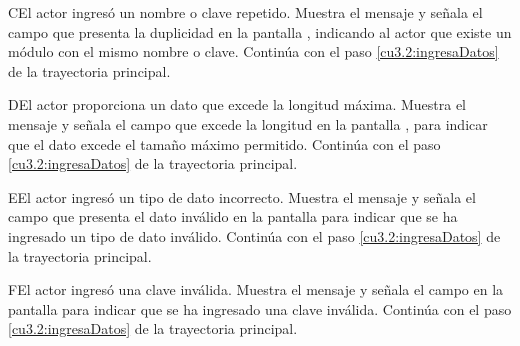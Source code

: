  \begin{UCtrayectoriaA}{C}{El actor ingresó un nombre o clave repetido.}
    \UCpaso[\UCsist] Muestra el mensaje  y señala el campo que presenta la duplicidad en la pantalla 
	    , indicando al actor que existe un módulo con el mismo nombre o clave.
    \UCpaso[] Continúa con el paso \ref{cu3.2:ingresaDatos} de la trayectoria principal.
 \end{UCtrayectoriaA}
 
 \begin{UCtrayectoriaA}{D}{El actor proporciona un dato que excede la longitud máxima.}
    \UCpaso[\UCsist] Muestra el mensaje  y señala el campo que excede la 
    longitud en la pantalla , para indicar que el dato excede el tamaño máximo permitido.
    \UCpaso[] Continúa con el paso \ref{cu3.2:ingresaDatos} de la trayectoria principal.
 \end{UCtrayectoriaA}
 
 \begin{UCtrayectoriaA}{E}{El actor ingresó un tipo de dato incorrecto.}
    \UCpaso[\UCsist] Muestra el mensaje  y señala el campo que presenta el dato inválido en la 
    pantalla  para indicar que se ha ingresado un tipo de dato inválido.
    \UCpaso[] Continúa con el paso \ref{cu3.2:ingresaDatos} de la trayectoria principal.
 \end{UCtrayectoriaA}
 \begin{UCtrayectoriaA}{F}{El actor ingresó una clave inválida.}
    \UCpaso[\UCsist] Muestra el mensaje  y señala el campo en la 
    pantalla  para indicar que se ha ingresado una clave inválida.
    \UCpaso[] Continúa con el paso \ref{cu3.2:ingresaDatos} de la trayectoria principal.
 \end{UCtrayectoriaA}